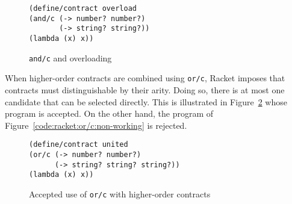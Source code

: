 \documentclass[sigplan,10pt,review,anonymous]{acmart}
\newcommand{\racket}[1]{\lstinline[language=racket]{#1}}
\begin{document}


\begin{figure}[h]
\begin{lstlisting}[language=racket]
(define/contract overload
(and/c (-> number? number?)
       (-> string? string?))
(lambda (x) x))
\end{lstlisting}
\caption{\racket{and/c} and overloading}
\label{fig:racket-overloading}
\end{figure}

When higher-order contracts are combined using \racket{or/c}, Racket imposes
that contracts must distinguishable by their arity. Doing so, there is at most
one candidate that can be selected directly. This is illustrated in
Figure~\ref{code:racket:or/c:working} whose program is accepted. On the other
hand, the program of Figure~\ref{code:racket:or/c:non-working} is rejected.


\begin{figure}[h]

\begin{lstlisting}[language=racket]
(define/contract united
(or/c (-> number? number?)
      (-> string? string? string?))
(lambda (x) x))
\end{lstlisting}
\caption{Accepted use of \racket{or/c} with higher-order contracts}
\label{code:racket:or/c:working}

\end{figure}
\end{document}
